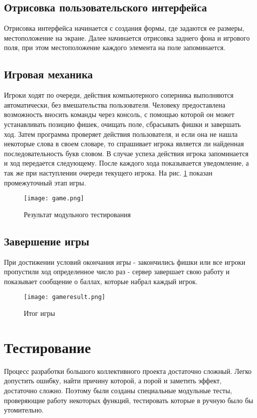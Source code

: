 \documentclass[a4paper,14pt]{article}
\begin{document}
	\subsection[Отрисовка интерфейса]{Отрисовка пользовательского интерфейса}
	Отрисовка интерфейса начинается с создания формы, где задаются ее размеры, местоположение на экране. Далее начинается отрисовка заднего фона и игрового поля, при этом местоположение каждого элемента на поле запоминается.
		
	\subsection{Игровая механика}
	Игроки ходят по очереди, действия компьютерного соперника выполняются автоматически, без вмешательства пользователя. Человеку предоставлена возможность вносить команды через консоль, с помощью которой он может устанавливать позицию фишек, очищать поле, сбрасывать фишки и завершать ход. Затем программа проверяет действия пользователя, и если она не нашла некоторые слова в своем словаре, то спрашивает игрока является ли найденная последовательность букв словом. В случае успеха действия игрока запоминается и ход передается следующему. После каждого хода показывается уведомление, а так же при наступлении очереди текущего игрока. На рис. \ref{img:game} показан промежуточный этап игры.
	
	\begin{figure}[bhtp]
		\centering
		\texttt{[image: game.png]}
		\caption{Результат модульного тестирования}
		\label{img:game}
	\end{figure}

	\subsection{Завершение игры}
	При достижении условий окончания игры - закончились фишки или все игроки пропустили ход определенное число раз - сервер завершает свою работу и показывает сообщение о баллах, которые набрал каждый игрок.
	
	\begin{figure}[bhtp]
		\centering
		\texttt{[image: gameresult.png]}
		\caption{Итог игры}\label{img:gameresult}
	\end{figure}
\section{Тестирование}
	Процесс разработки большого коллективного проекта достаточно сложный. Легко допустить ошибку, найти причину которой, а порой и заметить эффект, достаточно сложно. Поэтому были созданы специальные модульные тесты, проверяющие работу некоторых функций, тестировать которые в ручную было бы утомительно.
	
\end{document}
